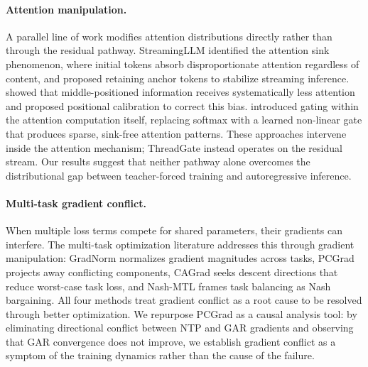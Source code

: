 \paragraph{Attention manipulation.}
A parallel line of work modifies attention distributions directly rather than through the residual pathway. StreamingLLM \citep{xiao2024streaming} identified the attention sink phenomenon, where initial tokens absorb disproportionate attention regardless of content, and proposed retaining anchor tokens to stabilize streaming inference. \citet{ko2024found} showed that middle-positioned information receives systematically less attention and proposed positional calibration to correct this bias. \citet{qiu2025gated} introduced gating within the attention computation itself, replacing softmax with a learned non-linear gate that produces sparse, sink-free attention patterns. These approaches intervene inside the attention mechanism; ThreadGate instead operates on the residual stream. Our results suggest that neither pathway alone overcomes the distributional gap between teacher-forced training and autoregressive inference.

\paragraph{Multi-task gradient conflict.}
When multiple loss terms compete for shared parameters, their gradients can interfere. The multi-task optimization literature addresses this through gradient manipulation: GradNorm \citep{chen2018gradnorm} normalizes gradient magnitudes across tasks, PCGrad \citep{yu2020pcgrad} projects away conflicting components, CAGrad \citep{liu2021cagrad} seeks descent directions that reduce worst-case task loss, and Nash-MTL \citep{navon2022nash} frames task balancing as Nash bargaining. All four methods treat gradient conflict as a root cause to be resolved through better optimization. We repurpose PCGrad as a causal analysis tool: by eliminating directional conflict between NTP and GAR gradients and observing that GAR convergence does not improve, we establish gradient conflict as a symptom of the training dynamics rather than the cause of the failure.

